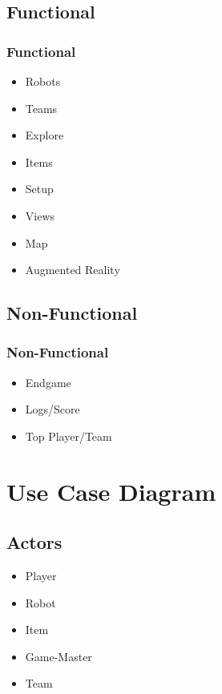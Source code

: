 \documentclass{beamer}
\begin{document}
\subsection{Functional}
\begin{frame}
\frametitle{Functional}
\begin{itemize}
	\item Robots
	\item Teams
	\item Explore
	\item Items
	\item Setup
	\item Views
	\item Map
	\item Augmented Reality
\end{itemize}
\end{frame}
\subsection{Non-Functional}
\begin{frame}
\frametitle{Non-Functional}
\begin{itemize}
	\item Endgame
	\item Logs/Score
 	\item Top Player/Team
\end{itemize}
\end{frame}
\section{Use Case Diagram}
\subsection{Actors}
\begin{frame}
	\begin{itemize}
	\item Player
	\item Robot
	\item Item
	\item Game-Master
	\item Team
\end{itemize}
\end{frame}
\end{document}
